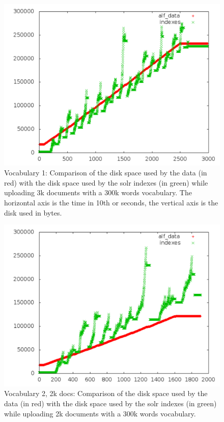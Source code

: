 \documentclass[12pt,a4]{article}
\begin{document}
\begin{figure}[h]
\begin{center}
\includegraphics[width=130mm]{solr_3kdocs_300kwords}
\end{center}
\caption{Vocabulary 1: Comparison of the disk space used by the data (in red) with the disk space used by the solr indexes (in green) while uploading 3k documents with a 300k words vocabulary. The horizontal axis is the time in 10th or seconds, the vertical axis is the disk used in bytes.}
\end{figure}



\begin{figure}[h]
\begin{center}
\includegraphics[width=130mm]{out_vocab2_2kdocs}
\end{center}
\caption{Vocabulary 2, 2k docs: Comparison of the disk space used by the data (in red) with the disk space used by the solr indexes (in green) while uploading 2k documents with a 300k words vocabulary.}
\end{figure}
\end{document}
